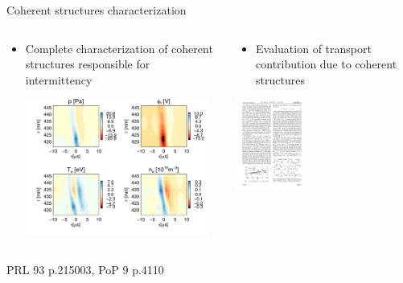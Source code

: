 \documentclass[t,10pt]{beamer}
\begin{document}
\begin{frame}{Coherent structures characterization}


\begin{columns}[t]
\begin{column}{0.47\textwidth}
\begin{itemize}
\item Complete characterization of coherent structures responsible for
  intermittency 
\begin{center}
\includegraphics[height=4.5cm]{2Dstructure}
\end{center}
\end{itemize}
\end{column}
\pause
\begin{column}{0.5\textwidth}
\begin{itemize}
\item Evaluation of transport contribution due to coherent structures
\end{itemize}
\begin{center}
\includegraphics[height=3cm]{structure-diffusivity}
\end{center}
\end{column}
\end{columns}
\begin{center}
{\tiny PRL 93 p.215003, PoP 9 p.4110}
\end{center}
\end{frame}
\end{document}
